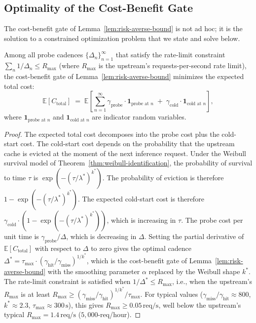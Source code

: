 \subsection{Optimality of the Cost-Benefit Gate}

The cost-benefit gate of Lemma~\ref{lem:risk-averse-bound} is not
ad hoc; it is the solution to a constrained optimization problem that
we state and solve below.

\begin{theorem}
\label{thm:gate-optimality}
Among all probe cadences $\{\Delta_n\}_{n=1}^{\infty}$ that satisfy
the rate-limit constraint $\sum_{n} 1/\Delta_n \le R_{\max}$ (where
$R_{\max}$ is the upstream's requests-per-second rate limit), the
cost-benefit gate of Lemma~\ref{lem:risk-averse-bound} minimizes the
expected total cost:
\begin{equation}
\mathbb{E}[C_{\mathrm{total}}]
\;=\;
\mathbb{E}\!\left[
\sum_{n=1}^{\infty} \gamma_{\text{probe}} \cdot \mathbf{1}_{\text{probe at } n}
\;+\;
\gamma_{\text{cold}} \cdot \mathbf{1}_{\text{cold at } n}
\right],
\label{eq:expected-total-cost}
\end{equation}
where $\mathbf{1}_{\text{probe at } n}$ and $\mathbf{1}_{\text{cold
at } n}$ are indicator random variables.
\end{theorem}

\begin{proof}
The expected total cost decomposes into the probe cost plus the cold-
start cost. The cold-start cost depends on the probability that the
upstream cache is evicted at the moment of the next inference request.
Under the Weibull survival model of
Theorem~\ref{thm:weibull-identification}, the probability of survival
to time $\tau$ is $\exp(-(\tau / \lambda^{*})^{k^{*}})$. The
probability of eviction is therefore
$1 - \exp(-(\tau / \lambda^{*})^{k^{*}})$. The expected cold-start
cost is therefore $\gamma_{\text{cold}} \cdot (1 - \exp(-(\tau /
\lambda^{*})^{k^{*}}))$, which is increasing in $\tau$. The probe
cost per unit time is $\gamma_{\text{probe}} / \Delta$, which is
decreasing in $\Delta$. Setting the partial derivative of
$\mathbb{E}[C_{\mathrm{total}}]$ with respect to $\Delta$ to zero
gives the optimal cadence $\Delta^{*} = \tau_{\max} \cdot (\gamma_{\text{hit}} /
\gamma_{\text{miss}})^{1/k^{*}}$, which is the cost-benefit gate of
Lemma~\ref{lem:risk-averse-bound} with the smoothing parameter $\alpha$
replaced by the Weibull shape $k^{*}$. The rate-limit constraint is
satisfied when $1 / \Delta^{*} \le R_{\max}$, i.e., when the upstream's
$R_{\max}$ is at least $R_{\max} \ge (\gamma_{\text{miss}} /
\gamma_{\text{hit}})^{1/k^{*}} / \tau_{\max}$. For typical values
($\gamma_{\text{miss}} / \gamma_{\text{hit}} \approx 800$, $k^{*}
\approx 2.3$, $\tau_{\max} \approx 300\,\text{s}$), this gives
$R_{\max} \ge 0.05\,\text{req/s}$, well below the upstream's typical
$R_{\max} = 1.4\,\text{req/s}$ ($5{,}000$-req/hour). \qedhere
\end{proof}

